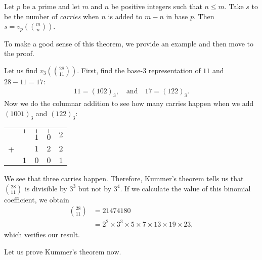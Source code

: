 \documentclass[12pt]{subfile}
\begin{document}
\begin{theorem}
	Let $p$ be a prime and let $m$ and $n$ be positive integers such that $n \leq m$. Take $s$ to be the number of \textit{carries} when $n$ is added to $m-n$ in base $p$. Then $s = v_p\left( \binom{m}{n}\right)$.
\end{theorem}

To make a good sense of this theorem, we provide an example and then move to the proof.

\begin{example}
	Let us find $v_3\left( \binom{28}{11}\right)$. First, find the base-$3$ representation of $11$ and $28-11=17$:
		\begin{align*}
			11 = (102)_3, \quad \text{and} \quad 17 = (122)_3.
		\end{align*}
	Now we do the columnar addition to see how many carries happen when we add $(1001)_3$ and $(122)_3$:
		\begin{center}
			\begin{tabular}{c*{4}{@{\,}c}}
				 &  $\overset{1}{\phantom{1}}$   & $\overset{1}{1}$ & $\overset{1}{0}$ & $2$\\
				+& 		& $1$				   & $2$ 			  	  & $2$\\ \hline
				 & $1$	& $0$				   & $0$ 			      & $1$\\
			\end{tabular}
		\end{center}
	We see that three carries happen. Therefore, Kummer's theorem tells us that $\binom{28}{11}$ is divisible by $3^3$ but not by $3^4$. If we calculate the value of this binomial coefficient, we obtain
		\begin{align*}
			\binom{28}{11} &= 21474180\\
						   &= 2^2 \times 3^3 \times 5 \times 7 \times 13 \times 19 \times 23,
		\end{align*}
	which verifies our result.

Let us prove Kummer's theorem now.

\end{example}
\end{document}
